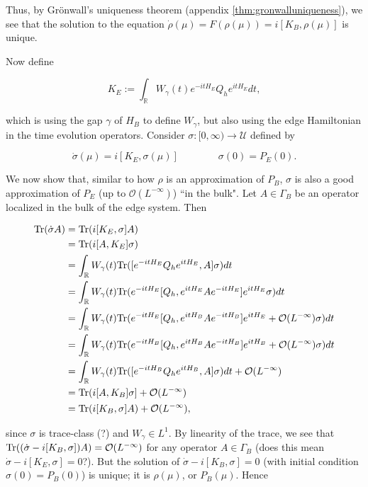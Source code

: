 \documentclass[12pt, letterpaper]{article}
\begin{document}
Thus, by Gr\"{o}nwall's uniqueness theorem (appendix \ref{thm:gronwalluniqueness}), we see that the solution to the equation $\dot{\rho}(\mu) = F(\rho(\mu)) = i[K_B,\rho(\mu)]$ is unique. 

Now define 

\[K_E := \int_\mathbb{R} W_\gamma(t) e^{-itH_E}Q_he^{itH_E}dt,\]

which is using the gap $\gamma$ of $H_B$ to define $W_\gamma$, but also using the edge Hamiltonian in the time evolution operators. Consider $\sigma:[0,\infty)\to\mathcal{U}$ defined by

\[\dot{\sigma}(\mu) = i[K_E, \sigma(\mu)] \quad\quad\quad\quad \sigma(0) = P_E(0).\]

We now show that, similar to how $\rho$ is an approximation of $P_B$, $\sigma$ is also a good approximation of $P_E$ (up to $\mathcal{O}(L^{-\infty})$) ``in the bulk". Let $A\in \Gamma_B$ be an operator localized in the bulk of the edge system. Then 

\[\begin{aligned}
\text{Tr}(\dot{\sigma} A) &= \text{Tr} (i[K_E, \sigma]A)\\
&= \text{Tr}(i[A,K_E]\sigma)\\
&= \int_\mathbb{R}W_\gamma(t) \text{Tr}([e^{-itH_E}Q_he^{itH_E}, A] \sigma)dt\\
&= \int_\mathbb{R}W_\gamma(t) \text{Tr}(e^{-itH_E}[Q_h, e^{itH_E}Ae^{-itH_E}]e^{itH_E} \sigma)dt\\
&= \int_\mathbb{R}W_\gamma(t) \text{Tr}(e^{-itH_E}[Q_h, e^{itH_B}Ae^{-itH_B}]e^{itH_E} + \mathcal{O}(L^{-\infty})\sigma)dt\\
&= \int_\mathbb{R}W_\gamma(t) \text{Tr}(e^{-itH_B}[Q_h, e^{itH_B}Ae^{-itH_B}]e^{itH_B} + \mathcal{O}(L^{-\infty})\sigma)dt\\
&= \int_\mathbb{R}W_\gamma(t) \text{Tr}([e^{-itH_B}Q_he^{itH_B}, A] \sigma)dt + \mathcal{O}(L^{-\infty})\\
&= \text{Tr}(i[A,K_B]\sigma] + \mathcal{O}(L^{-\infty})\\
&= \text{Tr}(i[K_B,\sigma]A) + \mathcal{O}(L^{-\infty}),
\end{aligned}\]

since $\sigma$ is trace-class (?) and $W_\gamma \in L^1$. By linearity of the trace, we see that $\text{Tr}((\dot{\sigma} - i[K_B,\sigma])A) = \mathcal{O}(L^{-\infty})$ for any operator $A \in \Gamma_B$ (does this mean $\dot{\sigma}-i[K_E,\sigma] = 0$?). But the solution of $\dot{\sigma} - i[K_B,\sigma] = 0$ (with initial condition $\sigma(0)=P_B(0)$) is unique; it is $\rho(\mu)$, or $P_B(\mu)$. Hence
\end{document}
